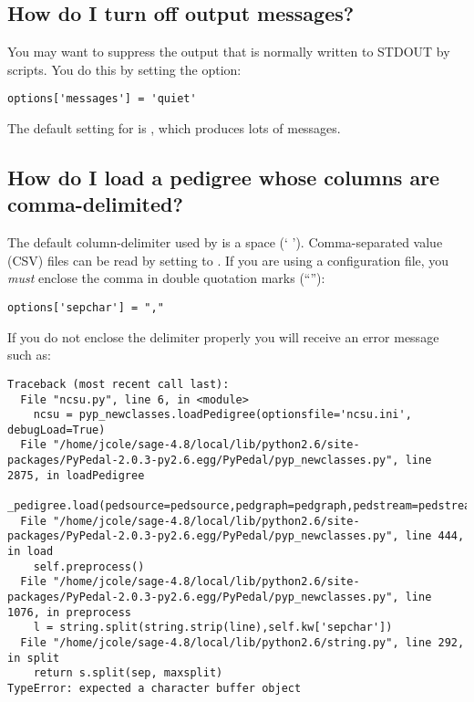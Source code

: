 \subsection{How do I turn off output messages?}
\label{sec:howto-turn-off-messages}
You may want to suppress the output that is normally written to STDOUT by scripts.  You do this by setting the  option:
\begin{verbatim}
options['messages'] = 'quiet'
\end{verbatim}
The default setting for  is , which produces lots of messages.

\subsection{How do I load a pedigree whose columns are comma-delimited?}
\label{sec:howto-load-comma-delimited-pedigree}
The default column-delimiter used by \PyPedal{} is a space (` ').  Comma-separated value (CSV) files can be read by
setting  to .  If you are using a configuration file, you \emph{must} enclose the comma in
double quotation marks (``''):
\begin{verbatim}
options['sepchar'] = ","
\end{verbatim}
If you do not enclose the delimiter properly you will receive an error message such as:
\begin{verbatim}
Traceback (most recent call last):
  File "ncsu.py", line 6, in <module>
    ncsu = pyp_newclasses.loadPedigree(optionsfile='ncsu.ini', debugLoad=True)
  File "/home/jcole/sage-4.8/local/lib/python2.6/site-packages/PyPedal-2.0.3-py2.6.egg/PyPedal/pyp_newclasses.py", line 2875, in loadPedigree
    _pedigree.load(pedsource=pedsource,pedgraph=pedgraph,pedstream=pedstream)
  File "/home/jcole/sage-4.8/local/lib/python2.6/site-packages/PyPedal-2.0.3-py2.6.egg/PyPedal/pyp_newclasses.py", line 444, in load
    self.preprocess()
  File "/home/jcole/sage-4.8/local/lib/python2.6/site-packages/PyPedal-2.0.3-py2.6.egg/PyPedal/pyp_newclasses.py", line 1076, in preprocess
    l = string.split(string.strip(line),self.kw['sepchar'])
  File "/home/jcole/sage-4.8/local/lib/python2.6/string.py", line 292, in split
    return s.split(sep, maxsplit)
TypeError: expected a character buffer object
\end{verbatim}

